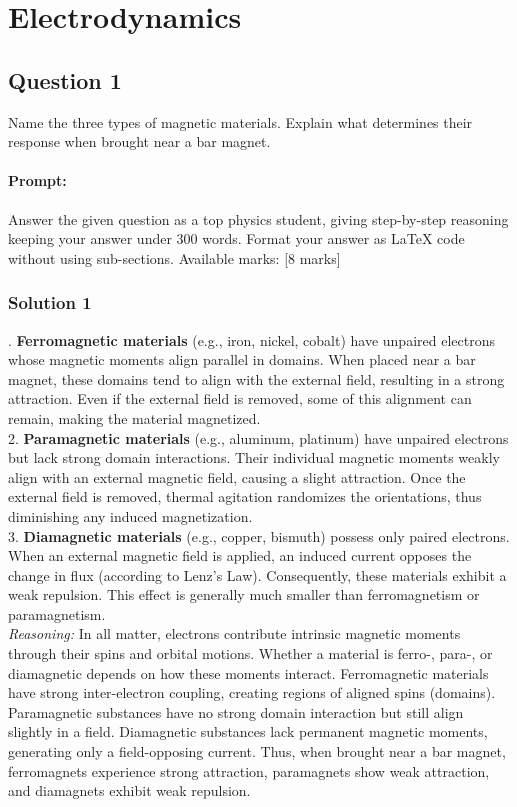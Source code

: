\documentclass{article}
\begin{document}
\section{Electrodynamics}

\subsection{Question 1}
Name the three types of magnetic materials. Explain what determines their response when brought near a bar magnet.

\paragraph{Prompt: \\} 
Answer the given question as a top physics student, giving step-by-step reasoning keeping your answer under 300 words. Format your answer as LaTeX code without using sub-sections. Available marks: [8 marks]

\subsubsection{Solution 1}
. \textbf{Ferromagnetic materials} (e.g., iron, nickel, cobalt) have unpaired electrons whose magnetic moments align parallel in domains. When placed near a bar magnet, these domains tend to align with the external field, resulting in a strong attraction. Even if the external field is removed, some of this alignment can remain, making the material magnetized.\\

2. \textbf{Paramagnetic materials} (e.g., aluminum, platinum) have unpaired electrons but lack strong domain interactions. Their individual magnetic moments weakly align with an external magnetic field, causing a slight attraction. Once the external field is removed, thermal agitation randomizes the orientations, thus diminishing any induced magnetization.\\

3. \textbf{Diamagnetic materials} (e.g., copper, bismuth) possess only paired electrons. When an external magnetic field is applied, an induced current opposes the change in flux (according to Lenz’s Law). Consequently, these materials exhibit a weak repulsion. This effect is generally much smaller than ferromagnetism or paramagnetism.\\

\noindent
\textit{Reasoning:} In all matter, electrons contribute intrinsic magnetic moments through their spins and orbital motions. Whether a material is ferro-, para-, or diamagnetic depends on how these moments interact. Ferromagnetic materials have strong inter-electron coupling, creating regions of aligned spins (domains). Paramagnetic substances have no strong domain interaction but still align slightly in a field. Diamagnetic substances lack permanent magnetic moments, generating only a field-opposing current. Thus, when brought near a bar magnet, ferromagnets experience strong attraction, paramagnets show weak attraction, and diamagnets exhibit weak repulsion. 
\end{document}
